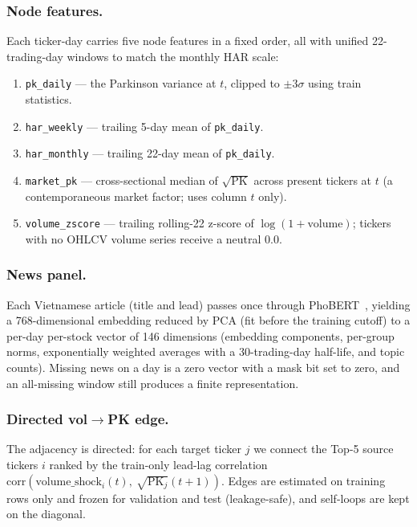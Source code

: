 \documentclass[runningheads]{llncs}
\begin{document}
\subsubsection{Node features.}
Each ticker-day carries five node features in a fixed order, all with unified 22-trading-day windows to
match the monthly HAR scale:
\begin{enumerate}
\item \texttt{pk\_daily} --- the Parkinson variance at $t$, clipped to $\pm 3\sigma$ using train statistics.
\item \texttt{har\_weekly} --- trailing 5-day mean of \texttt{pk\_daily}.
\item \texttt{har\_monthly} --- trailing 22-day mean of \texttt{pk\_daily}.
\item \texttt{market\_pk} --- cross-sectional median of $\sqrt{\text{PK}}$ across present tickers at $t$ (a
contemporaneous market factor; uses column $t$ only).
\item \texttt{volume\_zscore} --- trailing rolling-22 z-score of $\log(1+\text{volume})$; tickers with no
OHLCV volume series receive a neutral $0.0$.
\end{enumerate}

\subsubsection{News panel.}
Each Vietnamese article (title and lead) passes once through PhoBERT~\cite{phobert2020}, yielding a
768-dimensional embedding reduced by PCA (fit before the training cutoff) to a per-day per-stock vector of
146 dimensions (embedding components, per-group norms, exponentially weighted averages with a
30-trading-day half-life, and topic counts). Missing news on a day is a zero vector with a mask bit set to
zero, and an all-missing window still produces a finite representation.

\subsubsection{Directed vol$\to$PK edge.}
The adjacency is directed: for each target ticker $j$ we connect the Top-5 source tickers $i$ ranked by the
train-only lead-lag correlation
$\text{corr}(\text{volume\_shock}_i(t),\ \sqrt{\text{PK}_j}(t{+}1))$. Edges are estimated on training rows
only and frozen for validation and test (leakage-safe), and self-loops are kept on the diagonal.
\end{document}
